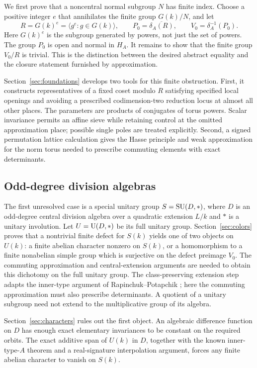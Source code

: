 We first prove that a noncentral normal subgroup $N$ has finite index.
Choose a positive integer $e$ that annihilates the finite group $G(k)/N$,
and let
\[
 R=G(k)^e=\langle g^e:g\in G(k)\rangle,\qquad
 P_0=\overline{\delta_A(R)},\qquad
 V_0=\delta_A^{-1}(P_0).
\]
Here $G(k)^e$ is the subgroup generated by powers, not just the set of
powers. The group $P_0$ is open and normal in $H_A$. It remains to show
that the finite group $V_0/R$ is trivial. This is the distinction between
the desired abstract equality and the closure statement furnished by
approximation.

Section~\ref{sec:foundations} develops two tools for this finite
obstruction. First, it constructs representatives of a fixed coset
modulo $R$ satisfying specified local openings and avoiding a prescribed
codimension-two reduction locus at almost all other places. The parameters
are products of conjugates of torus powers. Scalar invariance permits an
affine sieve while retaining control at the omitted approximation place;
possible single poles are treated explicitly. Second, a signed permutation
lattice calculation gives the Hasse principle and weak approximation for
the norm torus needed to prescribe commuting elements with exact
determinants.

\subsection{Odd-degree division algebras}

The first unresolved case is a special unitary group $S=\operatorname{SU}(D,*)$, where
$D$ is an odd-degree central division algebra over a quadratic extension
$L/k$ and $*$ is a unitary involution. Let $U=\operatorname{U}(D,*)$ be its full
unitary group. Section~\ref{sec:colors} proves that a nontrivial finite
defect for $S(k)$ yields one of two objects on $U(k)$: a finite abelian
character nonzero on $S(k)$, or a homomorphism to a finite nonabelian
simple group which is surjective on the defect preimage $V_0$.
The commuting approximation and central-extension arguments are needed
to obtain this dichotomy on the full unitary group. The class-preserving
extension step adapts the inner-type argument of Rapinchuk--Potapchik
\cite[Section~2]{RapinchukPotapchik1996}; here the commuting approximation
must also prescribe determinants. A quotient of a unitary subgroup need
not extend to the multiplicative group of its algebra.

Section~\ref{sec:characters} rules out the first object. An algebraic
difference function on $D$ has enough exact elementary invariances to be
constant on the required orbits. The exact additive span of $U(k)$ in
$D$, together with the known inner-type-$A$ theorem and a real-signature
interpolation argument, forces any finite abelian character to vanish
on $S(k)$.

